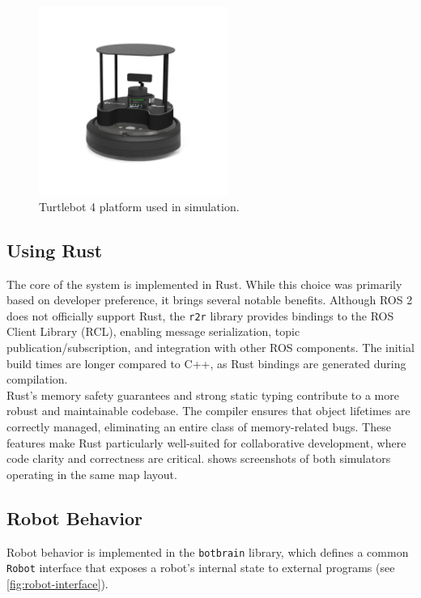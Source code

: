 \begin{figure}[h]
    \begin{center}
        \includegraphics[width=0.55\textwidth]{figures/tb4.png}
    \end{center}
    \caption{Turtlebot 4 platform used in simulation.}
    \label{fig:tb4}
\end{figure}

\subsection{Using Rust}
The core of the system is implemented in Rust. While this choice was primarily based on developer preference, it brings several notable benefits. Although ROS 2 does not officially support Rust, the \texttt{r2r} library \cite{r2r} provides bindings to the ROS Client Library (RCL), enabling message serialization, topic publication/subscription, and integration with other ROS components. The initial build times are longer compared to C++, as Rust bindings are generated during compilation.\\

Rust's memory safety guarantees and strong static typing contribute to a more robust and maintainable codebase. The compiler ensures that object lifetimes are correctly managed, eliminating an entire class of memory-related bugs. These features make Rust particularly well-suited for collaborative development, where code clarity and correctness are critical.  shows screenshots of both simulators operating in the same map layout.


% 


\subsection{Robot Behavior}
Robot behavior is implemented in the \texttt{botbrain} library, which defines a common \texttt{Robot} interface that exposes a robot’s internal state to external programs (see \cref{fig:robot-interface}).

